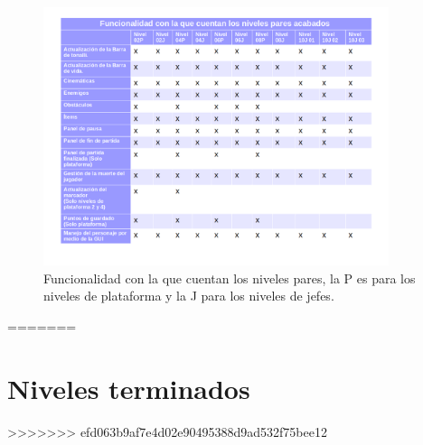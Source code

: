		\begin{figure}[h]
    			\centering
    			\includegraphics[width=0.9\textwidth]{04ResultadosObetnidos/imagenes/funcionalidadPares.png}
    			\caption{Funcionalidad con la que cuentan los niveles pares, la P es 
    			para los niveles de plataforma y la J para los niveles de jefes.}
    			\label{fig:NivelesPares}
		\end{figure}
=======


\section{Niveles terminados}
>>>>>>> efd063b9af7e4d02e90495388d9ad532f75bee12
